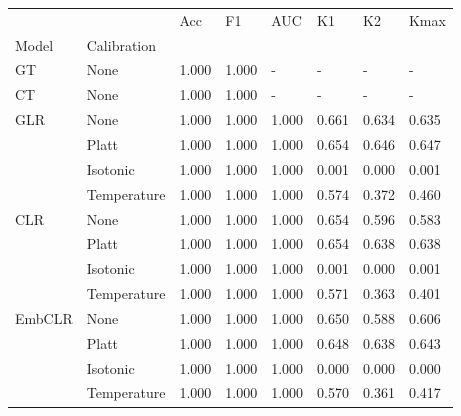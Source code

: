 \begin{tabular}{llllllll}
\toprule
 &  & Acc & F1 & AUC & K1 & K2 & Kmax \\
Model & Calibration &  &  &  &  &  &  \\
\midrule
GT & None & 1.000 & 1.000 & - & - & - & - \\
\cline{1-8}
CT & None & 1.000 & 1.000 & - & - & - & - \\
\cline{1-8}
\multirow[t]{4}{*}{GLR} & None & 1.000 & 1.000 & 1.000 & 0.661 & 0.634 & 0.635 \\
 & Platt & 1.000 & 1.000 & 1.000 & 0.654 & 0.646 & 0.647 \\
 & Isotonic & 1.000 & 1.000 & 1.000 & 0.001 & 0.000 & 0.001 \\
 & Temperature & 1.000 & 1.000 & 1.000 & 0.574 & 0.372 & 0.460 \\
\cline{1-8}
\multirow[t]{4}{*}{CLR} & None & 1.000 & 1.000 & 1.000 & 0.654 & 0.596 & 0.583 \\
 & Platt & 1.000 & 1.000 & 1.000 & 0.654 & 0.638 & 0.638 \\
 & Isotonic & 1.000 & 1.000 & 1.000 & 0.001 & 0.000 & 0.001 \\
 & Temperature & 1.000 & 1.000 & 1.000 & 0.571 & 0.363 & 0.401 \\
\cline{1-8}
\multirow[t]{4}{*}{EmbCLR} & None & 1.000 & 1.000 & 1.000 & 0.650 & 0.588 & 0.606 \\
 & Platt & 1.000 & 1.000 & 1.000 & 0.648 & 0.638 & 0.643 \\
 & Isotonic & 1.000 & 1.000 & 1.000 & 0.000 & 0.000 & 0.000 \\
 & Temperature & 1.000 & 1.000 & 1.000 & 0.570 & 0.361 & 0.417 \\
\cline{1-8}
\bottomrule
\end{tabular}
